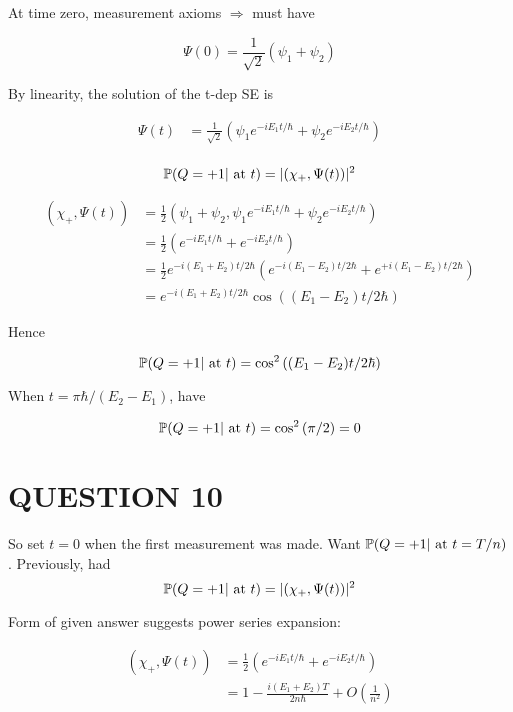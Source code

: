\documentclass[a4paper]{article}
\begin{document}
At time zero, measurement axioms $ \Rightarrow $ must have

\[ \Psi(0) = \frac{1}{\sqrt{2}} ( \psi_{1} + \psi_{2} ) \]

By linearity, the solution of the t-dep SE is

\begin{align*}
\Psi(t) & =  \frac{1}{\sqrt{2}} ( \psi_{1} e^{- i E_{1} t / \hbar } + \psi_{2} e^{- i E_{2} t / \hbar }  )  \\
\end{align*}

\[ \P( Q = +1 | \text{ at } t )  =  | ( \chi_{+}, \Psi(t) )  |^{2} \]

\begin{align*}
( \chi_{+}, \Psi(t) ) & = \frac{1}{2} (   \psi_{1} + \psi_{2}, \psi_{1} e^{- i E_{1} t / \hbar } + \psi_{2} e^{- i E_{2} t / \hbar }   )  \\
& = \frac{1}{2} ( e^{- i E_{1} t / \hbar } +  e^{- i E_{2} t / \hbar }) \\
& = \frac{1}{2}  e^{-i (E_{1} + E_{2})t/2 \hbar } ( e^{- i (E_{1}  - E_{2} ) t / 2 \hbar } +  e^{+ i (E_{1}  - E_{2} ) t / 2 \hbar }) \\
& = e^{-i (E_{1} + E_{2})t/2 \hbar } \cos \left(  (E_{1}  - E_{2} ) t / 2 \hbar \right) 
\end{align*}

Hence

\[ \P( Q = +1 | \text{ at } t )  = \cos^{2} \left(  (E_{1}  - E_{2} ) t / 2 \hbar \right)   \]

When $ t = \pi \hbar / (E_{2} - E_{1}) $, have 

\[ \P( Q = +1 | \text{ at } t )  = \cos^{2} \left( \pi / 2 \right) = 0   \]






\section{QUESTION 10}

So set $ t = 0 $ when the first measurement was made. Want $ \P( Q = +1 | \text{ at } t = T/n )  $.  Previously, had
\[ \P( Q = +1 | \text{ at } t  )  =  | ( \chi_{+}, \Psi(t) )  |^{2} \]

Form of given answer suggests power series expansion:

\begin{align*}
( \chi_{+}, \Psi(t) ) & = \frac{1}{2} ( e^{- i E_{1} t / \hbar } +  e^{- i E_{2} t / \hbar }) \\
& = 1 - \frac{i(E_{1} + E_{2})T}{2 n \hbar} + O\left( \frac{1}{n^{2}}\right) 
\end{align*}
\end{document}
